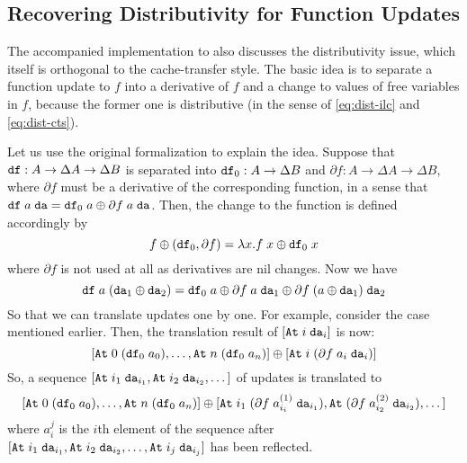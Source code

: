 \documentclass{article}
\theoremstyle{definition}
\begin{document}




\subsection{Recovering Distributivity for Function Updates}


The accompanied implementation to \citet{GiarrussoRS19} also discusses 
the distributivity issue, which itself is orthogonal to the cache-transfer style.
The basic idea is to separate a function update to $f$ into a derivative of $f$ and a change to values of free variables in $f$, because 
the former one is distributive (in the sense of \ref{eq:dist-ilc} and \ref{eq:dist-cts}). 

Let us use the original formalization to explain the idea. 
Suppose that $\texttt{df} : A \to \Delta A \to \Delta B$ is separated into $\texttt{df}_0 : A \to \Delta B$ and $\partial f : A \to \Delta A \to \Delta B$, where 
$\partial f$ must be a derivative of the corresponding function, in a sense that $\texttt{df} \; a \; \texttt{da} = \texttt{df}_0 \; a \oplus \partial f \; a \; \texttt{da}$.
Then, the change to the function is defined accordingly by 
\[
 f \oplus (\texttt{df}_0, \partial f) = \lambda x. f \; x \oplus \texttt{df}_0 \; x
\]
where $\partial f$ is not used at all as derivatives are nil changes. Now we have 
\[
 \texttt{df} \; a \; (\texttt{da}_1 \oplus \texttt{da}_2) = \texttt{df}_0 \; a \oplus \partial f \; a \; \texttt{da}_1 \oplus \partial f \; (a \oplus \texttt{da}_1) \; \texttt{da}_2 
\]
So that we can translate updates one by one. For example, consider the  case mentioned earlier. 
Then, the translation result of $[\texttt{At} \; i \; \texttt{da}_i]$ is now:
\[
[ \texttt{At} \; 0 \; (\texttt{df}_0 \; a_0), \dots, \texttt{At} \; n \; (\texttt{df}_0 \; a_n) ] \oplus [\texttt{At} \; i \; (\partial f \; a_i \; \texttt{da}_i)]
\]
So, a sequence $[\texttt{At} \; {i_1} \; \texttt{da}_{i_1}, \texttt{At} \; {i_2} \; \texttt{da}_{i_2},\dots]$ of updates is translated to 
\[
[ \texttt{At} \; 0 \; (\texttt{df}_0 \; a_0), \dots, \texttt{At} \; n \; (\texttt{df}_0 \; a_n) ] \oplus [\texttt{At} \; i_1 \; (\partial f \; a^{(1)}_{i_i} \; \texttt{da}_{i_1}), \texttt{At} \; (\partial f \; a^{(2)}_{i_2} \; \texttt{da}_{i_2}), \dots]
\]
where $a^j_i$ is the $i$th element of the sequence after $[\texttt{At} \; {i_1} \; \texttt{da}_{i_1}, \texttt{At} \; {i_2} \; \texttt{da}_{i_2},\dots, \texttt{At} \; {i_j} \; \texttt{da}_{i_j}]$ has been reflected. 
\end{document}
